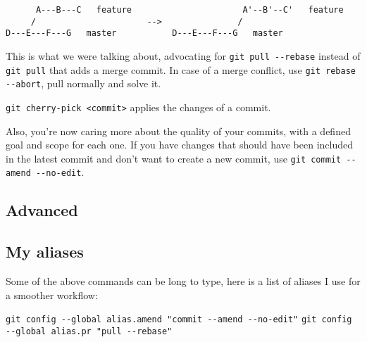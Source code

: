 \begin{center}
\begin{verbatim}
      A---B---C   feature                      A'--B'--C'   feature
     /                      -->               /          
D---E---F---G   master           D---E---F---G   master   
\end{verbatim}
\end{center}

This is what we were talking about, advocating for \texttt{git pull -{}-rebase} instead of \texttt{git pull} that adds a merge commit. In case of a merge conflict, use \texttt{git rebase -{}-abort}, pull normally and solve it.

\texttt{git cherry-pick <commit>} applies the changes of a commit.

Also, you're now caring more about the quality of your commits, with a defined goal and scope for each one. If you have changes that should have been included in the latest commit and don't want to create a new commit, use \texttt{git commit -{}-amend -{}-no-edit}.


\subsection*{Advanced}

\subsection*{My aliases}

Some of the above commands can be long to type, here is a list of aliases I use for a smoother workflow:

\texttt{git config -{}-global alias.amend "commit -{}-amend -{}-no-edit"}\newline
\texttt{git config -{}-global alias.pr "pull -{}-rebase"}